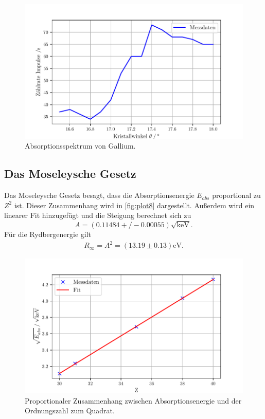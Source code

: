 \begin{figure}[H]
  \centering
  \includegraphics[width=\textwidth]{build/plot7.pdf}
  \caption{Absorptionsspektrum von Gallium.}
  \label{fig:plot7}
\end{figure}



\subsection{Das Moseleysche Gesetz} %
\label{sub:Das Moseleysche Gesetz}
Das Moseleysche Gesetz besagt, dass die Absorptionsenergie $E_{abs}$ proportional zu $Z^2$ ist.
Dieser Zusammenhang wird in \autoref{fig:plot8} dargestellt. Außerdem wird ein linearer Fit hinzugefügt
und die Steigung berechnet sich zu
\begin{equation}
  A = (0.11484+/-0.00055) \sqrt{\si{\kilo\electronvolt}}.
\end{equation}
Für die Rydbergenergie gilt
\begin{align}
  R_{\infty} = A^2 = (13.19 \pm 0.13) \si{\electronvolt}.
\end{align}

\begin{figure}[H]
  \centering
  \includegraphics[width=\textwidth]{build/plot8.pdf}
  \caption{Proportionaler Zusammenhang zwischen Absorptionsenergie und der Ordnungszahl zum Quadrat.}
  \label{fig:plot8}
\end{figure}

